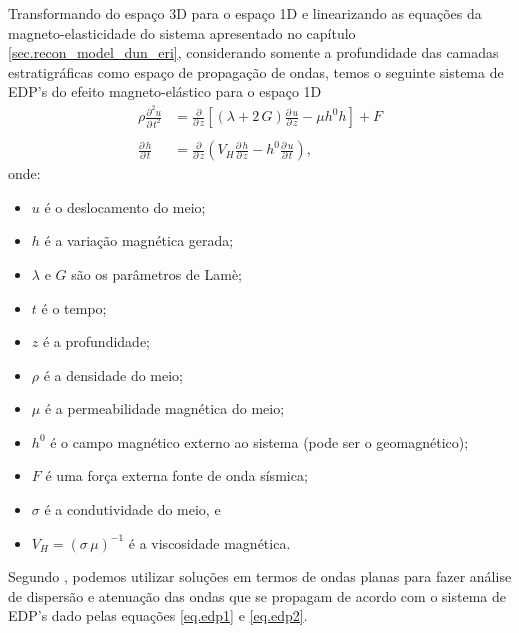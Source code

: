Transformando do espa\c{c}o 3D para o espa\c{c}o 1D e linearizando as equa\c{c}\~oes da magneto-elasticidade do sistema apresentado no cap\'itulo \ref{sec.recon_model_dun_eri}, considerando somente a profundidade das camadas estratigr\'aficas como espa\c{c}o de propaga\c{c}\~ao de ondas, temos o seguinte sistema de EDP's do efeito magneto-el\'astico para o espa\c{c}o 1D
\begin{align}\label{eq.edp1}
\rho\frac{\partial^2u}{\partial\,t^2}&=\frac{\partial}{\partial\,z}\left[(\lambda+2\,G)\frac{\partial\,u}{\partial\,z}-\mu h^0h\right]+F\\\nonumber\\\label{eq.edp2}
\frac{\partial\,h}{\partial\,t}&=\frac{\partial}{\partial\,z}\left(V_H\frac{\partial\,h}{\partial\,z}-h^0\frac{\partial\,u}{\partial\,t}\right),
\end{align}
onde:
\begin{itemize}
\item $u$ \'e o deslocamento do meio;
\item $h$ \'e a varia\c{c}\~ao magn\'etica gerada;
\item $\lambda$ e $G$ s\~ao os par\^ametros de Lam\`e;
\item $t$ \'e o tempo;
\item $z$ \'e a profundidade;
\item $\rho$ \'e a densidade do meio;
\item $\mu$ \'e a permeabilidade magn\'etica do meio;
\item $h^0$ \'e o campo magn\'etico externo ao sistema (pode ser o geomagn\'etico);
\item $F$ \'e uma for\c{c}a externa fonte de onda s\'ismica;
\item $\sigma$ \'e a condutividade do meio, e
\item $V_H=(\sigma\,\mu)^{-1}$ \'e a viscosidade magn\'etica.
\end{itemize}

Segundo \cite{Blanc_13}, podemos utilizar solu\c{c}\~oes em termos de ondas planas para fazer an\'alise de dispers\~ao e atenua\c{c}\~ao das ondas que se propagam de acordo com o sistema de EDP's dado pelas equa\c{c}\~oes \ref{eq.edp1} e \ref{eq.edp2}.

